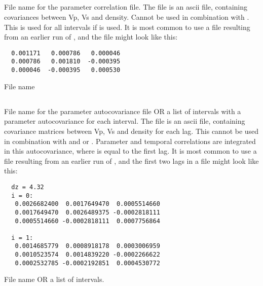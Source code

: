\subsection{}
 \slist
   \item \Description File name for the parameter correlation file. The file is an ascii file, containing covariances between Vp, Vs and density. Cannot be used in combination with . This is used for all intervals if  is used.
   It is most common to use a file resulting from an earlier run of \crava, and the file might look like this:

  \begin{verbatim}
  0.001171   0.000786   0.000046
  0.000786   0.001810  -0.000395
  0.000046  -0.000395   0.000530
  \end{verbatim}
   \item \Argument File name
   \item \Default
 \elist
 
\subsection{}
 \slist
   \item \Description File name for the parameter autocovariance file OR a list of intervals with a parameter autocovariance for each interval. The file is an ascii file, containing covariance matrices between Vp, Vs and density for each lag. This cannot be used in combination with  and  or . Parameter and temporal correlations are integrated in this autocovariance, where  is equal to the first lag.
   It is most common to use a file resulting from an earlier run of \crava, and the first two lags in a file might look like this:

  \begin{verbatim}
  dz = 4.32
  i = 0:
   0.0026682400  0.0017649470  0.0005514660 
   0.0017649470  0.0026489375 -0.0002818111 
   0.0005514660 -0.0002818111  0.0007756864 

  i = 1:
   0.0014685779  0.0008918178  0.0003006959 
   0.0010523574  0.0014839220 -0.0002266622 
   0.0002532785 -0.0002192851  0.0004530772 
  \end{verbatim}
   \item \Argument File name OR a list of intervals.
   \item \Default
 \elist 
 

